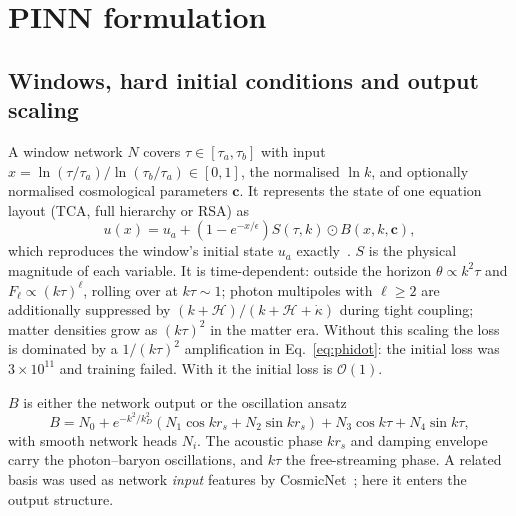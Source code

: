 \documentclass[prd,twocolumn,superscriptaddress,nofootinbib,floatfix]{revtex4-2}
\newcommand{\kd}{\dot\kappa}
\newcommand{\Hc}{\mathcal{H}}
\begin{document}
\section{PINN formulation}\label{sec:method}

\subsection{Windows, hard initial conditions and output scaling}
A window network $N$ covers $\tau\in[\tau_a,\tau_b]$ with input $x=\ln(\tau/\tau_a)/\ln(\tau_b/\tau_a)\in[0,1]$, the normalised $\ln k$, and optionally normalised cosmological parameters $\mathbf{c}$. It represents the state of one equation layout (TCA, full hierarchy or RSA) as
\begin{equation}
u(x)=u_a+\left(1-e^{-x/\epsilon}\right)S(\tau,k)\odot B(x,k,\mathbf{c}) ,\label{eq:hardic}
\end{equation}
which reproduces the window's initial state $u_a$ exactly~\cite{Lagaris1998}. $S$ is the physical magnitude of each variable. It is time-dependent: outside the horizon $\theta\propto k^2\tau$ and $F_\ell\propto(k\tau)^\ell$, rolling over at $k\tau\sim1$; photon multipoles with $\ell\ge2$ are additionally suppressed by $(k+\Hc)/(k+\Hc+\kd)$ during tight coupling; matter densities grow as $(k\tau)^2$ in the matter era. Without this scaling the loss is dominated by a $1/(k\tau)^2$ amplification in Eq.~\eqref{eq:phidot}: the initial loss was $3\times10^{11}$ and training failed. With it the initial loss is $\mathcal{O}(1)$.

$B$ is either the network output or the oscillation ansatz
\begin{equation}
B=N_0+e^{-k^2/k_D^2}\left(N_1\cos kr_s+N_2\sin kr_s\right)+N_3\cos k\tau+N_4\sin k\tau ,
\end{equation}
with smooth network heads $N_i$. The acoustic phase $kr_s$ and damping envelope carry the photon--baryon oscillations, and $k\tau$ the free-streaming phase. A related basis was used as network \emph{input} features by CosmicNet~\cite{CosmicNet1}; here it enters the output structure.
\end{document}
